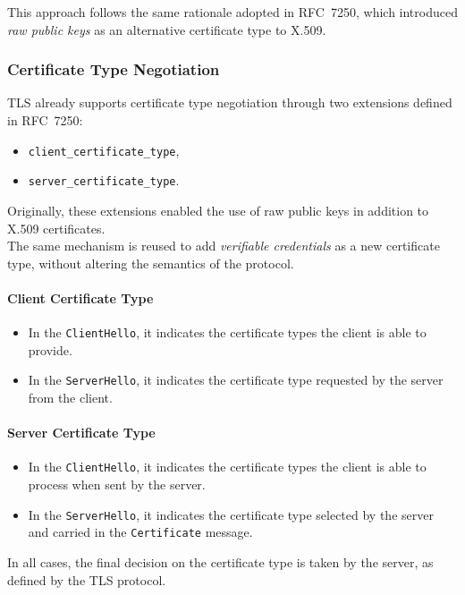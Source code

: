 \noindent
This approach follows the same rationale adopted in RFC~7250, which introduced \emph{raw public keys} as an alternative certificate type to X.509.

\subsubsection {Certificate Type Negotiation}

\noindent
TLS already supports certificate type negotiation through two extensions defined in RFC~7250:
\begin{itemize}
    \item \texttt{client\_certificate\_type},
    \item \texttt{server\_certificate\_type}.
\end{itemize}

\noindent
Originally, these extensions enabled the use of raw public keys in addition to X.509 certificates.\\  
The same mechanism is reused to add \emph{verifiable credentials} as a new certificate type, without altering the semantics of the protocol.

\paragraph{Client Certificate Type}
\noindent
\begin{itemize}
    \item In the \texttt{ClientHello}, it indicates the certificate types the client is able to provide.
    \item In the \texttt{ServerHello}, it indicates the certificate type requested by the server from the client.
\end{itemize}

\paragraph{Server Certificate Type}
\noindent
\begin{itemize}
    \item In the \texttt{ClientHello}, it indicates the certificate types the client is able to process when sent by the server.
    \item In the \texttt{ServerHello}, it indicates the certificate type selected by the server and carried in the \texttt{Certificate} message.
\end{itemize}

\noindent
In all cases, the final decision on the certificate type is taken by the server, as defined by the TLS protocol.

